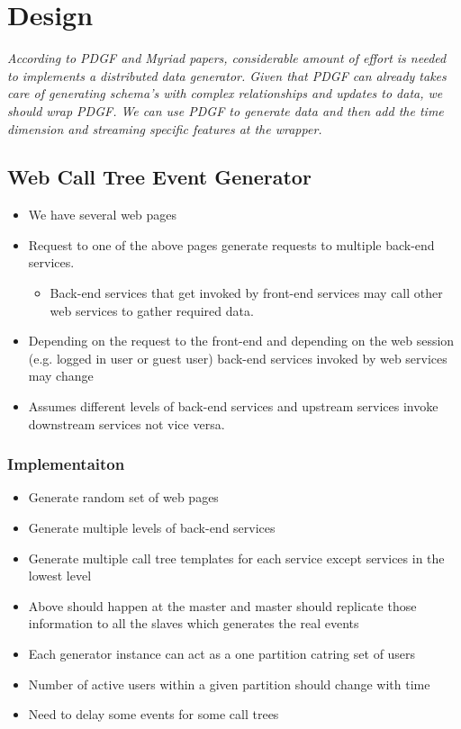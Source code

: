 \documentclass{thesis}
\begin{document}
\section{Design}

\emph{According to PDGF and Myriad papers, considerable amount of effort is needed to implements a distributed data generator. Given that PDGF can already takes care of generating schema's with complex relationships and updates to data, we should wrap PDGF. We can use PDGF to generate data and then add the time dimension and streaming specific features at the wrapper.}

\subsection{Web Call Tree Event Generator}

\begin{itemize}
    \item We have several web pages
    \item Request to one of the above pages generate requests to multiple back-end services.
    \begin{itemize}
        \item Back-end services that get invoked by front-end services may call other web services to gather required data.
    \end{itemize}
    \item Depending on the request to the front-end and depending on the web session (e.g. logged in user or guest user) back-end services invoked by web services may change
    \item Assumes different levels of back-end services and upstream services invoke downstream services not vice versa.
\end{itemize}

\subsubsection{Implementaiton}

\begin{itemize}
    \item Generate random set of web pages
    \item Generate multiple levels of back-end services
    \item Generate multiple call tree templates for each service except services in the lowest level
    \item Above should happen at the master and master should replicate those information to all the slaves which generates the real events
    \item Each generator instance can act as a one partition catring set of users
    \item Number of active users within a given partition should change with time
    \item Need to delay some events for some call trees
\end{itemize}
\end{document}
